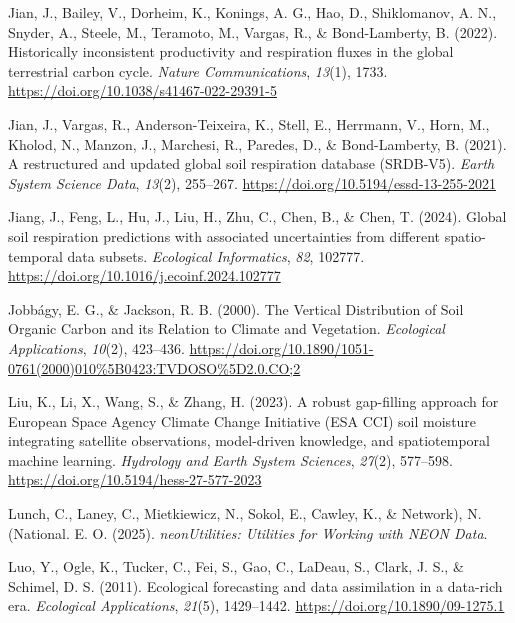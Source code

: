 \documentclass[
  letterpaper,
  DIV=11,
  numbers=noendperiod]{scrartcl}
\newlength{\cslhangindent}
\newenvironment{CSLReferences}[2] %
 {\begin{list}{}{%
  \setlength{\itemindent}{0pt}
  \setlength{\leftmargin}{0pt}
  \setlength{\parsep}{0pt}
  \ifodd #1
   \setlength{\leftmargin}{\cslhangindent}
   \setlength{\itemindent}{-1\cslhangindent}
  \fi
  \setlength{\itemsep}{#2\baselineskip}}}
 {\end{list}}
\begin{document}
\begin{CSLReferences}{1}{0}
Jian, J., Bailey, V., Dorheim, K., Konings, A. G., Hao, D., Shiklomanov,
A. N., Snyder, A., Steele, M., Teramoto, M., Vargas, R., \&
Bond-Lamberty, B. (2022). Historically inconsistent productivity and
respiration fluxes in the global terrestrial carbon cycle. \emph{Nature
Communications}, \emph{13}(1), 1733.
\url{https://doi.org/10.1038/s41467-022-29391-5}

Jian, J., Vargas, R., Anderson-Teixeira, K., Stell, E., Herrmann, V.,
Horn, M., Kholod, N., Manzon, J., Marchesi, R., Paredes, D., \&
Bond-Lamberty, B. (2021). A restructured and updated global soil
respiration database ({SRDB-V5}). \emph{Earth System Science Data},
\emph{13}(2), 255--267. \url{https://doi.org/10.5194/essd-13-255-2021}

Jiang, J., Feng, L., Hu, J., Liu, H., Zhu, C., Chen, B., \& Chen, T.
(2024). Global soil respiration predictions with associated
uncertainties from different spatio-temporal data subsets.
\emph{Ecological Informatics}, \emph{82}, 102777.
\url{https://doi.org/10.1016/j.ecoinf.2024.102777}

Jobbágy, E. G., \& Jackson, R. B. (2000). The {Vertical Distribution} of
{Soil Organic Carbon} and its {Relation} to {Climate} and {Vegetation}.
\emph{Ecological Applications}, \emph{10}(2), 423--436.
\url{https://doi.org/10.1890/1051-0761(2000)010\%5B0423:TVDOSO\%5D2.0.CO;2}

Liu, K., Li, X., Wang, S., \& Zhang, H. (2023). A robust gap-filling
approach for {European Space Agency Climate Change Initiative} ({ESA
CCI}) soil moisture integrating satellite observations, model-driven
knowledge, and spatiotemporal machine learning. \emph{Hydrology and
Earth System Sciences}, \emph{27}(2), 577--598.
\url{https://doi.org/10.5194/hess-27-577-2023}

Lunch, C., Laney, C., Mietkiewicz, N., Sokol, E., Cawley, K., \&
Network), N. (National. E. O. (2025). \emph{{neonUtilities}: {Utilities}
for {Working} with {NEON Data}}.

Luo, Y., Ogle, K., Tucker, C., Fei, S., Gao, C., LaDeau, S., Clark, J.
S., \& Schimel, D. S. (2011). Ecological forecasting and data
assimilation in a data-rich era. \emph{Ecological Applications},
\emph{21}(5), 1429--1442. \url{https://doi.org/10.1890/09-1275.1}


\end{CSLReferences}
\end{document}
